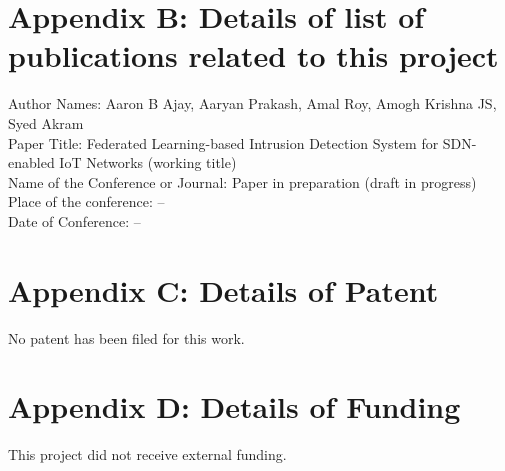 \documentclass[12pt,a4paper]{report}
\begin{document}
\clearpage
\section {Appendix B: Details of list of publications related to this project}
{\large Author Names: } Aaron B Ajay, Aaryan Prakash, Amal Roy, Amogh Krishna JS, Syed Akram \\
{\large Paper Title: } Federated Learning-based Intrusion Detection System for SDN-enabled IoT Networks (working title) \\
{\large Name of the Conference or Journal:} Paper in preparation (draft in progress) \\
{\large Place of the conference:} -- \\
{\large Date of Conference:} --
\clearpage
\section {Appendix C: Details of Patent}
No patent has been filed for this work.
\clearpage
\section {Appendix D: Details of Funding}
This project did not receive external funding.
\clearpage
\end{document}
